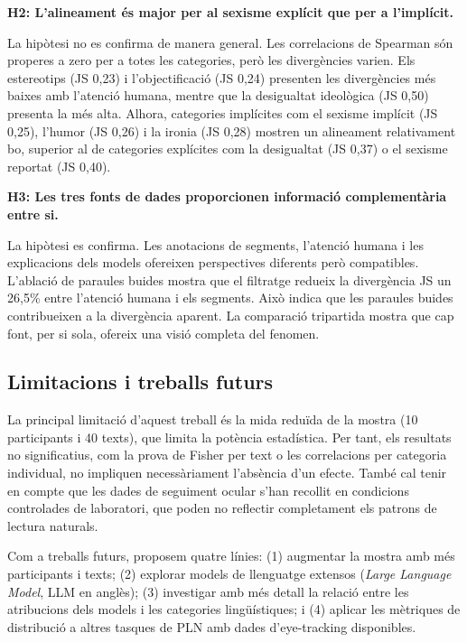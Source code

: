 \textbf{H2: L'alineament és major per al sexisme explícit que per a l'implícit.}

\noindent La hipòtesi no es confirma de manera general.
Les correlacions de Spearman són properes a zero per a totes les categories, però les divergències varien.
Els estereotips (JS 0,23) i l'objectificació (JS 0,24) presenten les divergències més baixes amb l'atenció humana, mentre que la desigualtat ideològica (JS 0,50) presenta la més alta.
Alhora, categories implícites com el sexisme implícit (JS 0,25), l'humor (JS 0,26) i la ironia (JS 0,28) mostren un alineament relativament bo, superior al de categories explícites com la desigualtat (JS 0,37) o el sexisme reportat (JS 0,40).

\textbf{H3: Les tres fonts de dades proporcionen informació complementària entre si.}

\noindent La hipòtesi es confirma.
Les anotacions de segments, l'atenció humana i les explicacions dels models ofereixen perspectives diferents però compatibles.
L'ablació de paraules buides mostra que el filtratge redueix la divergència JS un 26,5\% entre l'atenció humana i els segments. Això indica que les paraules buides contribueixen a la divergència aparent.
La comparació tripartida mostra que cap font, per si sola, ofereix una visió completa del fenomen.

\subsection*{Limitacions i treballs futurs}

La principal limitació d'aquest treball és la mida reduïda de la mostra (10 participants i 40 texts), que limita la potència estadística.
Per tant, els resultats no significatius, com la prova de Fisher per text o les correlacions per categoria individual, no impliquen necessàriament l'absència d'un efecte.
També cal tenir en compte que les dades de seguiment ocular s'han recollit en condicions controlades de laboratori, que poden no reflectir completament els patrons de lectura naturals.

Com a treballs futurs, proposem quatre línies:
(1) augmentar la mostra amb més participants i texts;
(2) explorar models de llenguatge extensos (\textit{Large Language Model}, LLM en anglès);
(3) investigar amb més detall la relació entre les atribucions dels models i les categories lingüístiques; i
(4) aplicar les mètriques de distribució a altres tasques de PLN amb dades d'eye-tracking disponibles.
